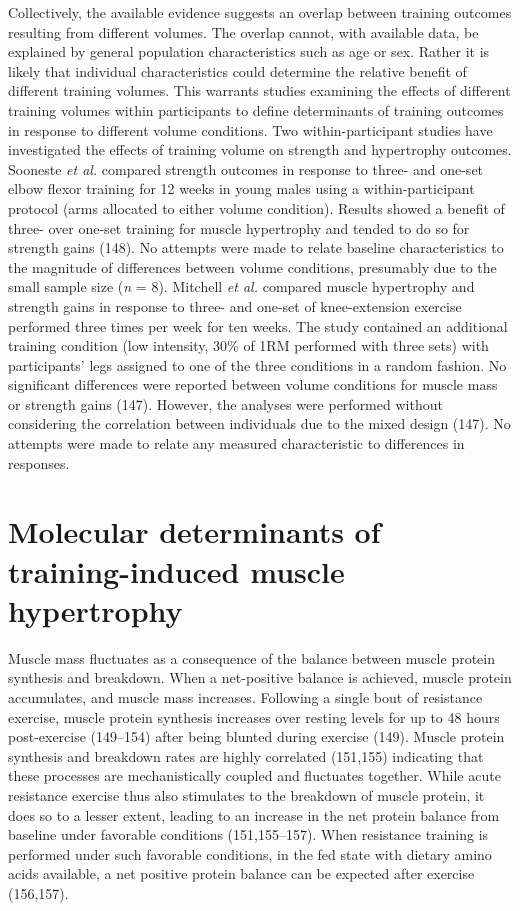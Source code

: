 \documentclass[twoside,10pt]{gihclass} %
\begin{document}
Collectively, the available evidence suggests an overlap between training outcomes resulting from different volumes.
The overlap cannot, with available data, be explained by general population characteristics such as age or sex.
Rather it is likely that individual characteristics could determine the relative benefit of different training volumes.
This warrants studies examining the effects of different training volumes within participants to define determinants of training outcomes in response to different volume conditions.
Two within-participant studies have investigated the effects of training volume on strength and hypertrophy outcomes.
Sooneste \emph{et al.} compared strength outcomes in response to three- and one-set elbow flexor training for 12 weeks in young males using a within-participant protocol (arms allocated to either volume condition).
Results showed a benefit of three- over one-set training for muscle hypertrophy and tended to do so for strength gains (148).
No attempts were made to relate baseline characteristics to the magnitude of differences between volume conditions, presumably due to the small sample size (\emph{n} = 8).
Mitchell \emph{et al.} compared muscle hypertrophy and strength gains in response to three- and one-set of knee-extension exercise performed three times per week for ten weeks.
The study contained an additional training condition (low intensity, 30\% of 1RM performed with three sets) with participants' legs assigned to one of the three conditions in a random fashion.
No significant differences were reported between volume conditions for muscle mass or strength gains (147).
However, the analyses were performed without considering the correlation between individuals due to the mixed design (147).
No attempts were made to relate any measured characteristic to differences in responses.

\hypertarget{molecular-determinants-of-training-induced-muscle-hypertrophy}{%
\section{Molecular determinants of training-induced muscle hypertrophy}\label{molecular-determinants-of-training-induced-muscle-hypertrophy}}

Muscle mass fluctuates as a consequence of the balance between muscle protein synthesis and breakdown. When a net-positive balance is achieved, muscle protein accumulates, and muscle mass increases.
Following a single bout of resistance exercise, muscle protein synthesis increases
over resting levels for up to 48 hours post-exercise
(149--154)
after being blunted during exercise
(149).
Muscle protein synthesis and breakdown rates are highly correlated
(151,155)
indicating that these processes are mechanistically coupled and fluctuates together.
While acute resistance exercise thus also stimulates to the breakdown of muscle protein, it does so to a lesser extent, leading to an increase in the net protein balance from baseline under favorable conditions
(151,155--157).
When resistance training is performed under such favorable conditions, in the fed state with dietary amino acids available, a net positive protein balance can be expected after exercise
(156,157).
\end{document}
